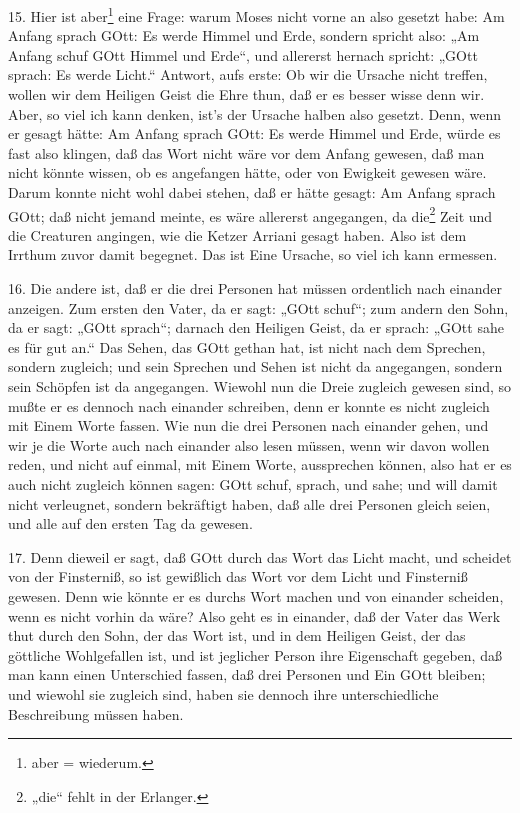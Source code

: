 15. Hier ist aber\footnote{aber = wiederum.} eine Frage: warum Moses nicht vorne an also gesetzt habe: Am Anfang sprach GOtt: Es werde Himmel und Erde, sondern spricht also: „Am Anfang schuf GOtt Himmel und Erde“, und allererst hernach spricht: „GOtt sprach: Es werde Licht.“ Antwort, aufs erste: Ob wir die Ursache nicht treffen, wollen wir dem Heiligen Geist die Ehre thun, daß er es besser wisse denn wir. Aber, so viel ich kann denken, ist's der Ursache halben also gesetzt. Denn, wenn er gesagt hätte: Am Anfang sprach GOtt: Es werde Himmel und Erde, würde es fast also klingen, daß das Wort nicht wäre vor dem Anfang gewesen, daß man nicht könnte wissen, ob es angefangen hätte, oder von Ewigkeit gewesen wäre. Darum konnte nicht wohl dabei stehen, daß er hätte gesagt: Am Anfang sprach GOtt; daß nicht jemand meinte, es wäre allererst angegangen, da die\footnote{„die“ fehlt in der Erlanger.} Zeit und die Creaturen angingen, wie die Ketzer Arriani gesagt haben. Also ist dem Irrthum zuvor damit begegnet. Das ist Eine Ursache, so viel ich kann ermessen.

16. Die andere ist, daß er die drei Personen hat müssen ordentlich nach einander anzeigen. Zum ersten den Vater, da er sagt: „GOtt schuf“; zum andern den Sohn, da er sagt: „GOtt sprach“; darnach den Heiligen Geist, da er sprach: „GOtt sahe es für gut an.“ Das Sehen, das GOtt gethan hat, ist nicht nach dem Sprechen, sondern zugleich; und sein Sprechen und Sehen ist nicht da angegangen, sondern sein Schöpfen ist da angegangen. Wiewohl nun die Dreie zugleich gewesen sind, so mußte er es dennoch nach einander schreiben, denn er konnte es nicht zugleich mit Einem Worte fassen. Wie nun die drei Personen nach einander gehen, und wir je die Worte auch nach einander also lesen müssen, wenn wir davon wollen reden, und nicht auf einmal, mit Einem Worte, aussprechen können, also hat er es auch nicht zugleich können sagen: GOtt schuf, sprach, und sahe; und will damit nicht verleugnet, sondern bekräftigt haben, daß alle drei Personen gleich seien, und alle auf den ersten Tag da gewesen.

17. Denn dieweil er sagt, daß GOtt durch das Wort das Licht macht, und scheidet von der Finsterniß, so ist gewißlich das Wort vor dem Licht und Finsterniß gewesen. Denn wie könnte er es durchs Wort machen und von einander scheiden, wenn es nicht vorhin da wäre? Also geht es in einander, daß der Vater das Werk thut durch den Sohn, der das Wort ist, und in dem Heiligen Geist, der das göttliche Wohlgefallen ist, und ist jeglicher Person ihre Eigenschaft gegeben, daß man kann einen Unterschied fassen, daß drei Personen und Ein GOtt bleiben; und wiewohl sie zugleich sind, haben sie dennoch ihre unterschiedliche Beschreibung müssen haben.

